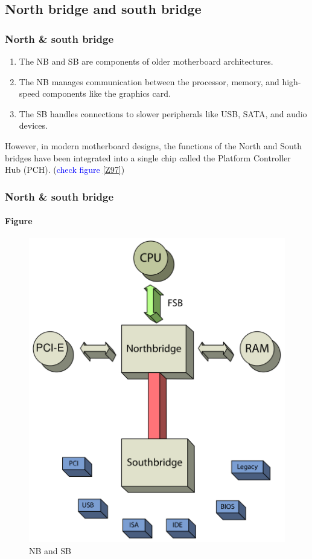 \documentclass[
	12pt, %
]{beamer}
\begin{document}

\subsection{North bridge and south bridge}

\begin{frame}
	\frametitle{North \& south bridge}
	\begin{enumerate}
		\item The NB and SB are components of older motherboard architectures.
		\item The NB manages communication between the processor, memory, and high-speed components like the graphics card. 
		\item The SB handles connections to slower peripherals like USB, SATA, and audio devices.
	\end{enumerate}
	
	\alert{However, in modern motherboard designs, the functions of the North and South bridges have been integrated into a single chip called the Platform Controller Hub (PCH). (\textcolor{blue}{check figure \ref{Z97}})}
\end{frame}


\begin{frame}
	\frametitle{North \& south bridge}
	\framesubtitle{Figure}
	\begin{figure}
		\centering
		\includegraphics[width=0.45\linewidth]{Images/img8.png}
		\caption{NB and SB}
		\label{NB and SB}
	\end{figure}
\end{frame}
\end{document}
